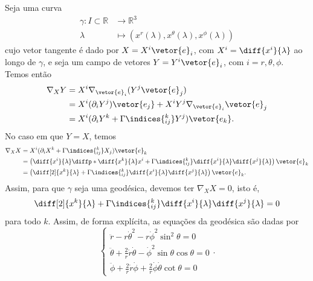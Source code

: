 Seja uma curva
\begin{align*}
    \gamma : I \subset \mathbb{R} &\to \mathbb{R}^3\\
                          \lambda &\mapsto \left(x^r(\lambda), x^\theta(\lambda), x^\phi(\lambda)\right)
\end{align*}
cujo vetor tangente é dado por \(X = X^i \vetor{e}_i\), com \(X^i = \diff{x^i}{\lambda}\) ao longo de \(\gamma\), e seja um campo de vetores \(Y = Y^i \vetor{e}_i\), com \(i = r, \theta, \phi\). Temos então
\begin{align*}
    \nabla_X Y &= X^i \nabla_{\vetor{e}_i} (Y^j \vetor{e}_j)\\
               &= X^i (\partial_{i}Y^j) \vetor{e_j} + X^iY^j\nabla_{\vetor{e}_i}\vetor{e}_j\\
               &= X^i (\partial_{i}Y^k + \Gamma\indices{^k_{ij}}Y^j)\vetor{e_k}.
\end{align*}
No caso em que \(Y = X\), temos
\begin{align*}
    \nabla_X X &= X^i (\partial_i X^k + \Gamma\indices{^k_{ij}}X_j)\vetor{e}_k\\
               &= \left(\diff{x^i}{\lambda} \diffp*{\diff{x^k}{\lambda}}{x^i} + \Gamma\indices{^k_{ij}}\diff{x^i}{\lambda}\diff{x^j}{\lambda}\right)\vetor{e}_k\\
               &= \left(\diff[2]{x^k}{\lambda} + \Gamma\indices{^k_{ij}}\diff{x^i}{\lambda}\diff{x^j}{\lambda}\right)\vetor{e}_k.
\end{align*}
Assim, para que \(\gamma\) seja uma geodésica, devemos ter \(\nabla_X X = 0\), isto é,
\begin{equation*}
   \diff[2]{x^k}{\lambda} + \Gamma\indices{^k_{ij}}\diff{x^i}{\lambda}\diff{x^j}{\lambda} = 0
\end{equation*}
para todo \(k\). Assim, de forma explícita, as equações da geodésica são dadas por
\begin{equation*}
    \begin{cases}
        \ddot{r} - r\dot{\theta}^2 -r\dot{\phi}^2 \sin^2\theta = 0\\
        \ddot{\theta} + \frac2r \dot{r}\dot{\theta} - \dot{\phi}^2\sin\theta\cos\theta=0\\
        \ddot{\phi} + \frac2r \dot{r}\dot{\phi} + \frac2r \dot\phi\dot\theta \cot\theta = 0
    \end{cases}.
\end{equation*}

